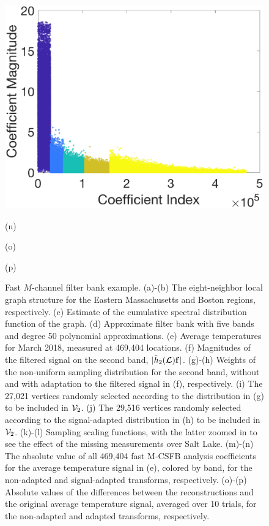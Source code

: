 \documentclass[journal, 10pt]{IEEEtran}
\begin{document}
\begin{figure}[tb]
\begin{minipage}[m]{0.24\linewidth}
\centerline{\includegraphics[width=1\linewidth]{fig_temp_analysis_coeffs_adapted}}
\centerline{\small{(n)}}
\end{minipage}
\begin{minipage}[m]{0.24\linewidth}
\centerline{\small{(o)}}
\end{minipage}
\begin{minipage}[m]{0.24\linewidth}
\centerline{\small{(p)}}
\end{minipage}
\caption{Fast $M$-channel filter bank example. (a)-(b) The eight-neighbor local graph structure for the Eastern Massachusetts and Boston regions, respectively. (c) Estimate of the cumulative spectral distribution function of the graph. (d) Approximate filter bank with five bands and degree 50 polynomial approximations. (e) Average temperatures for March 2018, measured at 469,404 locations. (f) Magnitudes of the filtered signal on the second band, $|\tilde{h}_2(\boldsymbol{\mathcal{L}}){\bf f}|$. (g)-(h) Weights of the non-uniform sampling distribution for the second band, without and with adaptation to the filtered signal in (f), respectively. (i) The 27,021 vertices randomly selected according to the distribution in (g) to be included in ${\mathcal{V}}_2$. (j) The 29,516 vertices randomly selected according to the signal-adapted distribution in (h) to be included in ${\mathcal{V}}_2$. (k)-(l) Sampling scaling functions, with the latter zoomed in to see the effect of the missing measurements over Salt Lake. (m)-(n) The absolute value of all 469,404 fast M-CSFB analysis coefficients for the average temperature signal in (e), colored by band, for the non-adapted and signal-adapted transforms, respectively. {\color{red}(o)-(p) Absolute values of the differences between the reconstructions and the original average temperature signal, averaged over 10 trials, for the non-adapted and adapted transforms, respectively.}} \label{Fig:temperature}
\end{figure}
\end{document}
